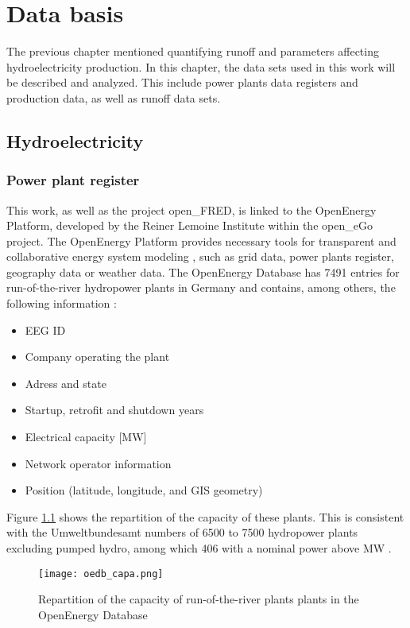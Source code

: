 \chapter{Data basis}
\label{chap:data_basis}

The previous chapter mentioned quantifying runoff and parameters affecting hydroelectricity production. In this chapter, the data sets used in this work will be described and analyzed. This include power plants data registers and production data, as well as runoff data sets.

\section{Hydroelectricity}
\label{hpp_register}

\subsection{Power plant register}
\label{sub:hpp_reg}
This work, as well as the project open\_FRED, is linked to the OpenEnergy Platform, developed by the Reiner Lemoine Institute within the open\_eGo project. The OpenEnergy Platform provides necessary tools for transparent and collaborative energy system modeling \cite{oedb}, such as grid data, power plants register, geography data or weather data. The OpenEnergy Database has 7491 entries for run-of-the-river hydropower plants in Germany and contains, among others, the following information :
\begin{itemize}
\itemsep0em 
 \item EEG ID
 \item Company operating the plant
 \item Adress and state
 \item Startup, retrofit and shutdown years
 \item Electrical capacity [\unit{MW}]
 \item Network operator information
 \item Position (latitude, longitude, and GIS geometry)
\end{itemize}


Figure \ref{oedb_capa} shows the repartition of the capacity of these plants. This is consistent with the Umweltbundesamt numbers of 6500 to 7500 hydropower plants excluding pumped hydro, among which 406 with a nominal power above \unit[1]{MW} \cite{uba_wasserkraft}. 

\begin{figure}[H]
\texttt{[image: oedb\_capa.png]}
\caption[Repartition of the capacity of run-of-the-river plants in the OpenEnergy Database]{Repartition of the capacity of run-of-the-river plants plants in the OpenEnergy Database}
\centering
\label{oedb_capa}
\end{figure}


